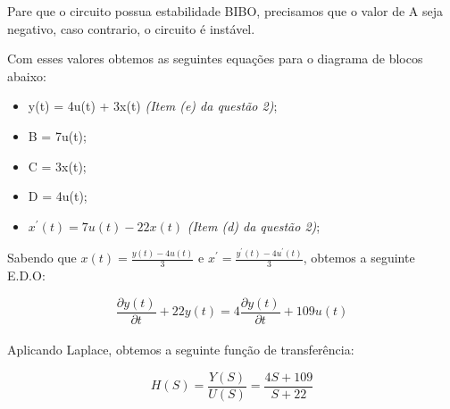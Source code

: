 \documentclass[a4paper, 12pt]{article}
\begin{document}
	Pare que o circuito possua estabilidade BIBO, precisamos que o valor de A seja negativo, caso contrario, o circuito é instável.

	Com esses valores obtemos as seguintes equações para o diagrama de blocos abaixo:

		\begin{itemize}
			\item y(t) = 4u(t) + 3x(t) \textit{(Item (e) da questão 2)};
			\item B = 7u(t);
			\item C = 3x(t);
			\item D = 4u(t);
			\item $x^{'}(t) = 7u(t) - 22x(t)$ \textit{(Item (d) da questão 2)};
		\end{itemize}

	Sabendo que $x(t) = \frac{y(t) - 4u(t)}{3}$ e  $x^{'} = \frac{y^{'}(t) - 4u^{'}(t)}{3}$, obtemos a seguinte E.D.O:

	\[
	\frac{\partial y(t)}{\partial t} + 22y(t) = 4\frac{\partial y(t)}{\partial t} + 109u(t)
	\] 	\\

	Aplicando Laplace, obtemos a seguinte função de transferência:

	\[
	H(S) = \frac{Y(S)}{U(S)} = \frac{4S + 109}{S +22}
	\] 	\\
\end{document}
